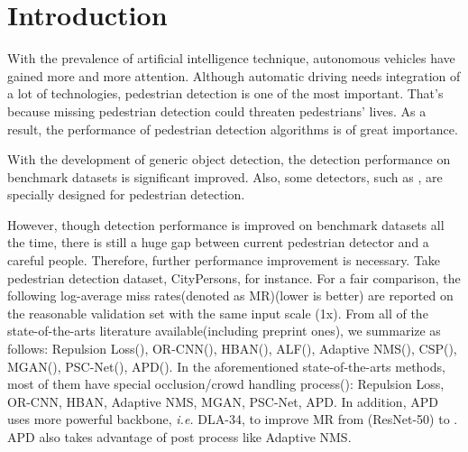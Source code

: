 \documentclass[twocolumn]{article}
\begin{document}
\section{Introduction}
With the prevalence of artificial intelligence technique, autonomous vehicles have gained more and more attention. Although automatic driving needs integration of a lot of technologies, pedestrian detection is one of the most important. That's because missing pedestrian detection could threaten pedestrians' lives. As a result, the performance of pedestrian detection algorithms is of great importance. \par 
With the development of generic object detection\cite{redmon2017yolo9000, redmon2016you, liu2016ssd, ren2015faster, girshick2014rich, girshick2015fast}, the detection performance on benchmark datasets\cite{dollar2009pedestrian, geiger2012we, zhang2017citypersons, shao2018crowdhuman, braun2019eurocity} is significant improved. Also, some detectors, such as \cite{liu2018learning, liu2019high, DBLP:journals/corr/abs-1910-09188,pang2019mask}, are specially designed for pedestrian detection. \par 
However, though detection performance is improved on benchmark datasets all the time, there is still a huge gap between current pedestrian detector and a careful people\cite{zhang2017towards}. Therefore, further performance improvement is necessary. Take pedestrian detection dataset, CityPersons\cite{zhang2017citypersons}, for instance. For a fair comparison, the following log-average miss rates(denoted as MR)(lower is better) are reported on the reasonable validation set with the same input scale (1x). From all of the state-of-the-arts literature available(including preprint ones), we summarize as follows: Repulsion Loss\cite{wang2018repulsion}(), OR-CNN\cite{zhang2018occlusion}(), HBAN\cite{lu2019semantic}(), ALF\cite{liu2018learning}(), Adaptive NMS\cite{liu2019adaptive}(), CSP\cite{liu2019high}(), MGAN\cite{pang2019mask}(), PSC-Net\cite{xie2020psc}(), APD\cite{DBLP:journals/corr/abs-1910-09188}(). In the aforementioned state-of-the-arts methods, most of them have special occlusion/crowd handling process(): Repulsion Loss\cite{wang2018repulsion}, OR-CNN\cite{zhang2018occlusion}, HBAN\cite{lu2019semantic}, Adaptive NMS\cite{liu2019adaptive}, MGAN\cite{pang2019mask}, PSC-Net\cite{xie2020psc}, APD\cite{DBLP:journals/corr/abs-1910-09188}. In addition, APD\cite{DBLP:journals/corr/abs-1910-09188} uses more powerful backbone, \textit{i.e.} DLA-34\cite{yu2018deep}, to improve MR from (ResNet-50\cite{he2016deep}) to . APD\cite{DBLP:journals/corr/abs-1910-09188} also takes advantage of post process like Adaptive NMS\cite{liu2019adaptive}.\par 
\end{document}
